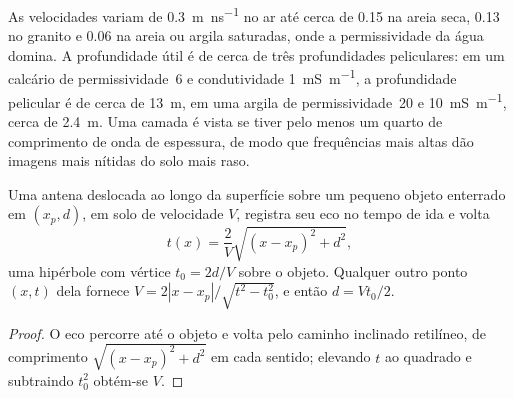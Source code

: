 As velocidades variam de \qty{0.3}{m.ns^{-1}} no ar até cerca de \num{0.15} na
areia seca, \num{0.13} no granito e \num{0.06} na areia ou
argila saturadas, onde a permissividade da água domina. A profundidade útil
é de cerca de três profundidades peliculares: em um calcário de permissividade~6 e
condutividade \qty{1}{mS.m^{-1}}, a profundidade pelicular é de cerca de \qty{13}{m},
em uma argila de permissividade~20 e \qty{10}{mS.m^{-1}}, cerca de
\qty{2.4}{m}. Uma camada é vista se tiver pelo menos um quarto de
comprimento de onda de espessura, de modo que frequências mais altas dão imagens mais nítidas
do solo mais raso.

\begin{proposition}\label{prop:b3:field-lab-methods-3:hyperbola}
Uma antena deslocada ao longo da superfície sobre um pequeno objeto enterrado em
$(x_p, d)$, em solo de velocidade $V$, registra seu eco no
tempo de ida e volta
\[
t(x) = \frac{2}{V}\sqrt{(x - x_p)^2 + d^2} ,
\]
uma hipérbole com vértice $t_0 = 2d/V$ sobre o objeto. Qualquer outro ponto
$(x, t)$ dela fornece $V = 2|x - x_p|/\sqrt{t^2 - t_0^2}$, e então $d =
Vt_0/2$.
\end{proposition}

\begin{proof}
O eco percorre até o objeto e volta pelo caminho inclinado retilíneo,
de comprimento $\sqrt{(x - x_p)^2 + d^2}$ em cada sentido; elevando $t$ ao quadrado e
subtraindo $t_0^2$ obtém-se $V$.
\end{proof}

